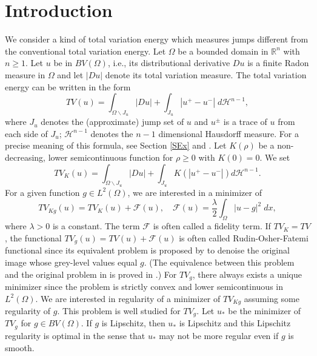 \documentclass[11pt]{amsart} %
\numberwithin{equation}{section}
\begin{document}
\maketitle
\thispagestyle{empty}

\section{Introduction} \label{SIn} %

We consider a kind of total variation energy which measures jumps different from the conventional total variation energy.
 Let $\Omega$ be a bounded domain in $\mathbb{R}^n$ with $n\geq1$.
 Let $u$ be in $BV(\Omega)$, i.e., its distributional derivative $Du$ is a finite Radon measure in $\Omega$ and let $|Du|$ denote its total variation measure.
 The total variation energy can be written in the form
\[
	TV(u) = \int_{\Omega\backslash J_u} |Du|
	+ \int_{J_u} |u^+ - u^-|\; d\mathcal{H}^{n-1},
\]
where $J_u$ denotes the (approximate) jump set of $u$ and $u^\pm$ is a trace of $u$ from each side of $J_u$; 
$\mathcal{H}^{n-1}$ denotes the $n-1$ dimensional Hausdorff measure.
 For a precise meaning of this formula, see Section \ref{SEx} and \cite{AFP}.
 Let $K(\rho)$ be a non-decreasing, lower semicontinuous function for $\rho\geq0$ with $K(0)=0$.
 We set
\[
	TV_K(u) = 	\int_{\Omega\backslash J_u} |Du|
	+ \int_{J_u} K \left(|u^+ - u^-|\right) d\mathcal{H}^{n-1}.
\]
For a given function $g\in L^2(\Omega)$, we are interested in a minimizer of
\[
	TV_{Kg}(u) = TV_K(u) + \mathcal{F}(u), \quad
	\mathcal{F}(u) = \frac{\lambda}{2} \int_\Omega |u-g|^2\; dx,
\]
where $\lambda>0$ is a constant.
 The term $\mathcal{F}$ is often called a fidelity term.
 If $TV_K=TV$, the functional $TV_g(u)=TV(u)+\mathcal{F}(u) $ is often called Rudin-Osher-Fatemi functional since its equivalent problem is proposed by \cite{ROF} to denoise the original image whose grey-level values equal $g$.
 (The equivalence between this problem and the original problem in \cite{ROF} is proved in \cite{CL97}.)
 For $TV_g$, there always exists a unique minimizer since the problem is strictly convex and lower semicontinuous in $L^2(\Omega)$.
 We are interested in regularity of a minimizer of $TV_{Kg}$ assuming some regularity of $g$.
 This problem is well studied for $TV_g$.
 Let $u_*$ be the minimizer of $TV_g$ for $g\in BV(\Omega)$.
 If $g$ is Lipschitz, then $u_*$ is Lipschitz and this Lipschitz regularity is optimal in the sense that $u_*$ may not be more regular even if $g$ is smooth.
\end{document}
